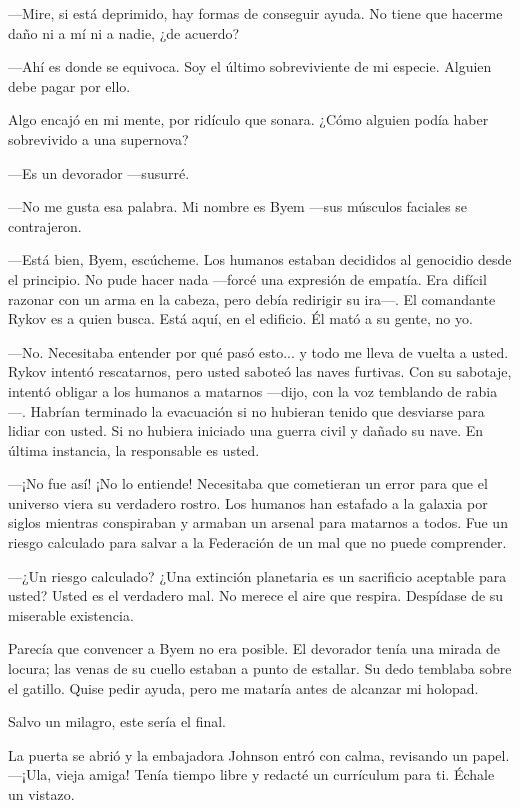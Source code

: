 —Mire, si está deprimido, hay formas de conseguir ayuda. No tiene que hacerme daño ni a mí ni a nadie, ¿de acuerdo?

—Ahí es donde se equivoca. Soy el último sobreviviente de mi especie. Alguien debe pagar por ello.

Algo encajó en mi mente, por ridículo que sonara. ¿Cómo alguien podía haber sobrevivido a una supernova?

—Es un devorador —susurré.

—No me gusta esa palabra. Mi nombre es Byem —sus músculos faciales se contrajeron.

—Está bien, Byem, escúcheme. Los humanos estaban decididos al genocidio desde el principio. No pude hacer nada —forcé una expresión de empatía. Era difícil razonar con un arma en la cabeza, pero debía redirigir su ira—. El comandante Rykov es a quien busca. Está aquí, en el edificio. Él mató a su gente, no yo.

—No. Necesitaba entender por qué pasó esto... y todo me lleva de vuelta a usted. Rykov intentó rescatarnos, pero usted saboteó las naves furtivas. Con su sabotaje, intentó obligar a los humanos a matarnos —dijo, con la voz temblando de rabia—. Habrían terminado la evacuación si no hubieran tenido que desviarse para lidiar con usted. Si no hubiera iniciado una guerra civil y dañado su nave. En última instancia, la responsable es usted.

—¡No fue así! ¡No lo entiende! Necesitaba que cometieran un error para que el universo viera su verdadero rostro. Los humanos han estafado a la galaxia por siglos mientras conspiraban y armaban un arsenal para matarnos a todos. Fue un riesgo calculado para salvar a la Federación de un mal que no puede comprender.

 —¿Un riesgo calculado? ¿Una extinción planetaria es un sacrificio aceptable para usted? Usted es el verdadero mal. No merece el aire que respira. Despídase de su miserable existencia.

Parecía que convencer a Byem no era posible. El devorador tenía una mirada de locura; las venas de su cuello estaban a punto de estallar. Su dedo temblaba sobre el gatillo. Quise pedir ayuda, pero me mataría antes de alcanzar mi holopad.

Salvo un milagro, este sería el final.

La puerta se abrió y la embajadora Johnson entró con calma, revisando un papel. —¡Ula, vieja amiga! Tenía tiempo libre y redacté un currículum para ti. Échale un vistazo.

